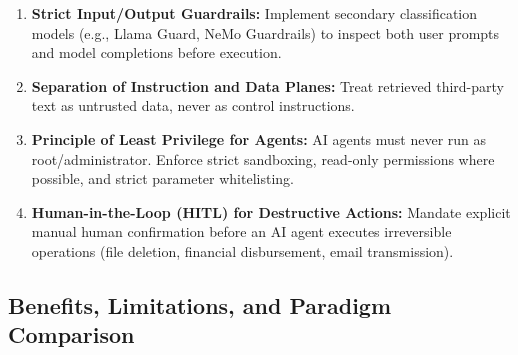 \begin{tcolorbox}[colback=teal!5!white,colframe=teal!60!black,title=\textbf{Defense-in-Depth Architectural Controls for Generative AI}]
\begin{enumerate}
\item \textbf{Strict Input/Output Guardrails:} Implement secondary classification models (e.g., Llama Guard, NeMo Guardrails) to inspect both user prompts and model completions before execution.
\item \textbf{Separation of Instruction and Data Planes:} Treat retrieved third-party text as untrusted data, never as control instructions.
\item \textbf{Principle of Least Privilege for Agents:} AI agents must never run as root/administrator. Enforce strict sandboxing, read-only permissions where possible, and strict parameter whitelisting.
\item \textbf{Human-in-the-Loop (HITL) for Destructive Actions:} Mandate explicit manual human confirmation before an AI agent executes irreversible operations (file deletion, financial disbursement, email transmission).
\end{enumerate}
\end{tcolorbox}

\subsection{Benefits, Limitations, and Paradigm Comparison}

